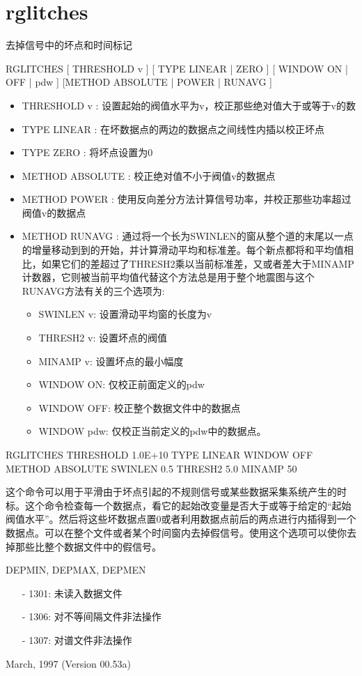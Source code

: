 \section{rglitches}
\label{cmd:rglitches}

去掉信号中的坏点和时间标记

RGLITCHES [ THRESHOLD v ] [ TYPE LINEAR | ZERO ] [ WINDOW ON | OFF | pdw ] [METHOD ABSOLUTE | POWER | RUNAVG ]

\begin{itemize}
\item THRESHOLD v : 设置起始的阀值水平为v，校正那些绝对值大于或等于v的数
\item TYPE LINEAR : 在坏数据点的两边的数据点之间线性内插以校正坏点 
\item TYPE ZERO : 将坏点设置为0 
\item METHOD ABSOLUTE : 校正绝对值不小于阀值v的数据点 
\item METHOD POWER : 使用反向差分方法计算信号功率，并校正那些功率超过阀值v的数据点 
\item METHOD RUNAVG : 通过将一个长为SWINLEN的窗从整个道的末尾以一点的增量移动到到的开始，并计算滑动平均和标准差。每个新点都将和平均值相比，如果它们的差超过了THRESH2乘以当前标准差，又或者差大于MINAMP计数器，它则被当前平均值代替这个方法总是用于整个地震图与这个RUNAVG方法有关的三个选项为:
	\begin{itemize}
	\item SWINLEN v: 设置滑动平均窗的长度为v
	\item THRESH2 v: 设置坏点的阀值
	\item MINAMP  v: 设置坏点的最小幅度
	\item WINDOW ON: 仅校正前面定义的pdw
	\item WINDOW OFF: 校正整个数据文件中的数据点
	\item WINDOW pdw: 仅校正当前定义的pdw中的数据点。
	\end{itemize} 
\end{itemize}

RGLITCHES THRESHOLD 1.0E+10 TYPE LINEAR WINDOW OFF METHOD ABSOLUTE SWINLEN 0.5 THRESH2 5.0 MINAMP 50

这个命令可以用于平滑由于坏点引起的不规则信号或某些数据采集系统产生的时标。这个命令检查每一个数据点，看它的起始改变量是否大于或等于给定的“起始阀值水平”。然后将这些坏数据点置0或者利用数据点前后的两点进行内插得到一个数据点。可以在整个文件或者某个时间窗内去掉假信号。使用这个选项可以使你去掉那些比整个数据文件中的假信号。

DEPMIN, DEPMAX, DEPMEN

\begin{itemize}
\item[-]1301: 未读入数据文件
\item[-]1306: 对不等间隔文件非法操作
\item[-]1307: 对谱文件非法操作
\end{itemize}

March, 1997 (Version 00.53a)
